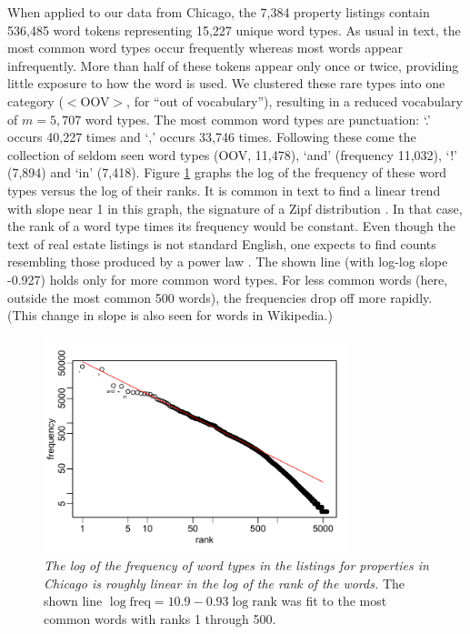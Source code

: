 \documentclass[10pt]{article}
\begin{document}
  
 When applied to our data from Chicago, the 7,384 property listings contain
 536,485 word tokens representing 15,227 unique word types.  As usual in text,
 the most common word types occur frequently whereas most words appear
 infrequently.  More than half of these tokens appear only once or twice,
 providing little exposure to how the word is used.  We clustered these rare
 types into one category ($<$OOV$>$, for ``out of vocabulary''), resulting in a
 reduced vocabulary of $m = 5,707$ word types.  The most common word types are
 punctuation: `.'  occurs 40,227 times and `,' occurs 33,746 times.  Following
 these come the collection of seldom seen word types (OOV, 11,478), `and'
 (frequency 11,032), `!' (7,894) and `in' (7,418).  Figure \ref{fig:zipf} graphs
 the log of the frequency of these word types versus the log of their ranks.  It
 is common in text to find a linear trend with slope near 1 in this graph, the
 signature of a Zipf distribution \citep{zipf35, baayen02}.  In that case, the
 rank of a word type times its frequency would be constant.  Even though the
 text of real estate listings is not standard English, one expects to find
 counts resembling those produced by a power law \citep{clauset09}.  The shown
 line (with log-log slope -0.927) holds only for more common word types.  For
 less common words (here, outside the most common 500 words), the frequencies
 drop off more rapidly.  (This change in slope is also seen for words in
 Wikipedia.)


 \begin{figure}
 \caption{ \label{fig:zipf} { \sl The log of the frequency of word types in the
 listings for properties in Chicago is roughly linear in the log of the rank of
 the words.}  The shown line $\log \mbox{freq} = 10.9 - 0.93 \log \mbox{rank}$ 
 was fit to the most common words with ranks 1 through 500.  }

 \centerline{
 \vspace{0.1in}
 \includegraphics[width=3.5in]{figures/zipf} }
 \vspace{0.2in}
 \end{figure}
\end{document}
